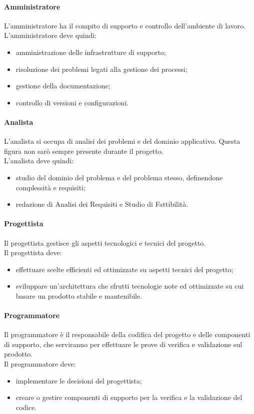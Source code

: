 			\paragraph{Amministratore}
			L'amministratore ha il compito di supporto e controllo dell'ambiente di lavoro. \\
			L'amministratore deve quindi:
			\begin{itemize}
				\item amministrazione delle infrastrutture di supporto;
				\item risoluzione dei problemi legati alla gestione dei processi;
				\item gestione della documentazione;
				\item controllo di versioni e configurazioni.
			\end{itemize}
			\paragraph{Analista}
			L'analista si occupa di analisi dei problemi e del dominio applicativo. Questa figura non sarò sempre presente durante il progetto. \\
			L'analista deve quindi:
			\begin{itemize}
				\item studio del dominio del problema e del problema stesso, definendone complessità e requisiti;
				\item redazione di Analisi dei Requisiti e Studio di Fattibilità.
			\end{itemize}
			\paragraph{Progettista}
			Il progettista gestisce gli aspetti tecnologici e tecnici del progetto.\\
			Il progettista deve:
			\begin{itemize}
				\item effettuare scelte efficienti ed ottimizzate su aspetti tecnici del progetto;
				\item sviluppare un'architettura che sfrutti tecnologie note ed ottimizzate su cui basare un prodotto stabile e mantenibile.
			\end{itemize}
			\paragraph{Programmatore}
			Il programmatore è il responsabile della codifica del progetto e delle componenti di supporto, che serviranno per effettuare le prove di verifica e validazione sul prodotto.\\
			Il programmatore deve:
			\begin{itemize}
				\item implementare le decisioni del progettista;
				\item creare o gestire componenti di supporto per la verifica e la validazione del codice.
			\end{itemize}
